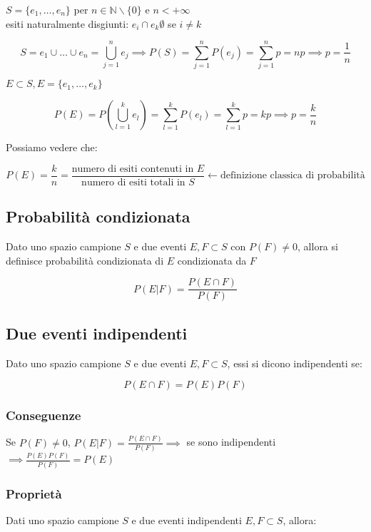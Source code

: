 \documentclass{subfiles}
\begin{document}
$S = \{e_1, \dots, e_n\}$ per $n \in \mathbb{N} \backslash \{0\}$ e $n < +\infty$\\

\noindent
esiti naturalmente disgiunti: $e_i \cap e_k \emptyset$ se $i \neq k$

$$
S = e_1 \cup \dots \cup e_n = \bigcup^n_{j=1} e_j \implies P(S) = \sum^n_{j=1} P(e_j) = \sum^n_{j=1} p = np \implies p = \frac{1}{n}
$$

\noindent
$E \subset S, E = \{e_1, \dots, e_k\}$

$$
P(E) = P(\bigcup^k_{l=1} e_l) = \sum^k_{l=1} P(e_l) = \sum^k_{l=1} p = kp \implies p = \frac{k}{n}
$$

\noindent
Possiamo vedere che:

$$
P(E) = \frac{k}{n} = \frac{\text{numero di esiti contenuti in } E}{\text{numero di esiti totali in } S} \leftarrow \text{definizione classica di probabilità}
$$

\subsection{Probabilità condizionata}

Dato uno spazio campione $S$ e due eventi $E, F \subset S$ con $P(F) \neq 0$, allora si definisce probabilità condizionata di $E$ condizionata da $F$

$$
P(E | F) = \frac{P(E \cap F)}{P(F)}
$$

\subsection{Due eventi indipendenti}

Dato uno spazio campione $S$ e due eventi $E, F \subset S$, essi si dicono indipendenti se:

$$
P(E \cap F) = P(E)P(F)
$$

\subsubsection{Conseguenze}

Se $P(F) \neq 0$, $P(E|F) = \frac{P(E \cap F)}{P(F)} \implies$ se sono indipendenti $\implies \frac{P(E)P(F)}{P(F)} = P(E)$

\subsubsection{Proprietà}

Dati uno spazio campione $S$ e due eventi indipendenti $E,F \subset S$, allora:
\end{document}
